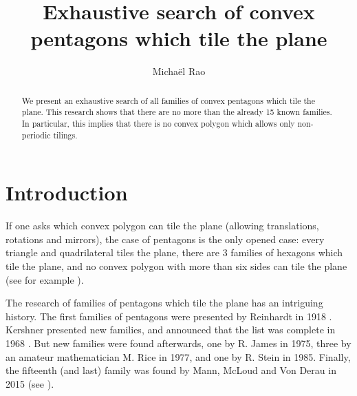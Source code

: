 \documentclass[11pt]{article}
\title{Exhaustive search of convex pentagons which tile the plane}
\author {Michaël Rao}
\theoremstyle{definition}
\begin{document}
\maketitle
%
%

\begin{abstract}
  We present an exhaustive search of all families of convex pentagons which tile the plane.
  This research shows that there are no more than the already 15 known families. 
  In particular, this implies that there is no convex polygon which allows only non-periodic tilings.
\end{abstract}

\def\note#1{}%

\def\plane{\mathbb{R}^2}
\def\surf{\mathcal{S}}
\def\seq{\mathfrak{s}}
\def\penta{\mathcal{P}}
\def\ver{s} %
\def\tiling{\mathcal{T}}
\def\nodes#1{\mathcal{T}(#1)} %
\def\fnodes#1{\mathcal{FT}(#1)} %
\def\vertex#1{\mathcal{V}(#1)} %
\def\ivertex#1{\mathcal{IV}(#1)} %
\def\ivertexh#1{\mathcal{IV}_H(#1)} %
\def\ivertexf#1{\mathcal{IV}_F(#1)} %
\def\vect{V} %
\def\cvect{{V^c}} %


\def\mfA{\mathfrak{A}}
\def\mX{\mathcal{X}}
\def\mY{\mathcal{Y}}
\def\mB{\mathcal{B}}

\def\v1{(1,1,1,1,1)}

\def\setvectype{\mathcal{W}} %
\def\setvecctype{{{\mathcal{W}}^c}} %

%

\section{Introduction}\label{sec:positive}

If one asks which convex polygon can tile the plane (allowing translations, rotations and mirrors), the case of pentagons is the only opened case: every triangle and quadrilateral tiles the plane, there are 3 families of hexagons which tile the plane, and no convex polygon with more than six sides can tile the plane (see for example \cite{Schattschneider}).

The research of families of pentagons which tile the plane has an intriguing history.
The first families of pentagons were presented by Reinhardt in 1918  \cite{Reinhardt}.
Kershner presented new families, and announced that the list was complete in 1968 \cite{Kershner}. But new families were found afterwards, one by R. James in 1975, three by an amateur mathematician M. Rice in 1977, and one by R. Stein in 1985. Finally, the fifteenth (and last) family was found by Mann, McLoud and Von Derau in 2015 (see \cite{last}).
\end{document}
